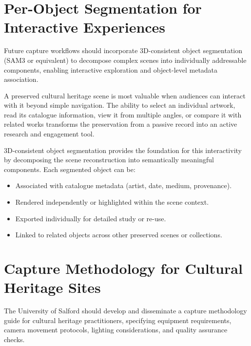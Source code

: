 \section{Per-Object Segmentation for Interactive Experiences}
\label{sec:rec-segmentation}

\begin{recommendation}
Future capture workflows should incorporate 3D-consistent object segmentation (SAM3 or equivalent) to decompose complex scenes into individually addressable components, enabling interactive exploration and object-level metadata association.
\end{recommendation}

A preserved cultural heritage scene is most valuable when audiences can interact with it beyond simple navigation. The ability to select an individual artwork, read its catalogue information, view it from multiple angles, or compare it with related works transforms the preservation from a passive record into an active research and engagement tool.

3D-consistent object segmentation provides the foundation for this interactivity by decomposing the scene reconstruction into semantically meaningful components. Each segmented object can be:

\begin{itemize}
  \item Associated with catalogue metadata (artist, date, medium, provenance).
  \item Rendered independently or highlighted within the scene context.
  \item Exported individually for detailed study or re-use.
  \item Linked to related objects across other preserved scenes or collections.
\end{itemize}

\section{Capture Methodology for Cultural Heritage Sites}
\label{sec:rec-capture}

\begin{recommendation}
The University of Salford should develop and disseminate a capture methodology guide for cultural heritage practitioners, specifying equipment requirements, camera movement protocols, lighting considerations, and quality assurance checks.
\end{recommendation}

